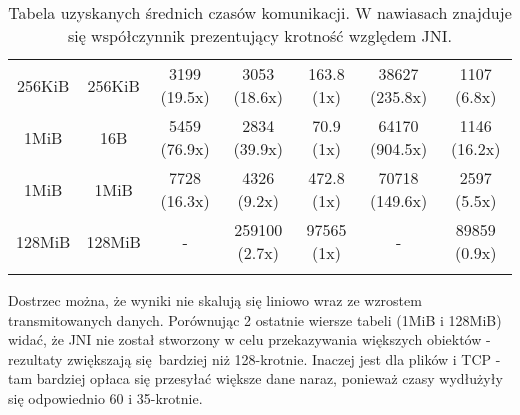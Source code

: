 \begin{longtable}{|c|c|c|c|c|c|c|}
    256KiB & 256KiB & 3199 (19.5x) & 3053 (18.6x) & 163.8 (1x) & 38627 (235.8x) & 1107 (6.8x) \\
    1MiB & 16B & 5459 (76.9x) & 2834 (39.9x) & 70.9 (1x) & 64170 (904.5x) & 1146 (16.2x) \\
    1MiB & 1MiB & 7728 (16.3x) & 4326 (9.2x) & 472.8 (1x) & 70718 (149.6x) & 2597 (5.5x) \\
    128MiB & 128MiB & - & 259100 (2.7x) & 97565 (1x) & - & 89859 (0.9x) \\
    \hline
    \caption{Tabela uzyskanych średnich czasów komunikacji. W nawiasach znajduje się współczynnik prezentujący krotność względem JNI.}
    \label{tab:all_results}
\end{longtable}


Dostrzec można, że wyniki nie skalują się liniowo wraz ze wzrostem transmitowanych danych. Porównując 2 ostatnie wiersze tabeli (1MiB i 128MiB) widać, że JNI nie został stworzony w celu przekazywania większych obiektów - rezultaty zwiększają się bardziej niż 128-krotnie. Inaczej jest dla plików i TCP - tam bardziej opłaca się przesyłać większe dane naraz, ponieważ czasy wydłużyły się odpowiednio 60 i 35-krotnie.
